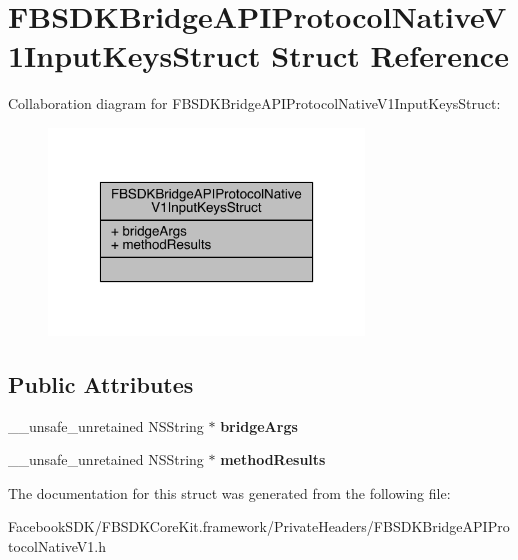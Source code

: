 \hypertarget{struct_f_b_s_d_k_bridge_a_p_i_protocol_native_v1_input_keys_struct}{\section{F\-B\-S\-D\-K\-Bridge\-A\-P\-I\-Protocol\-Native\-V1\-Input\-Keys\-Struct Struct Reference}
\label{struct_f_b_s_d_k_bridge_a_p_i_protocol_native_v1_input_keys_struct}
}


Collaboration diagram for F\-B\-S\-D\-K\-Bridge\-A\-P\-I\-Protocol\-Native\-V1\-Input\-Keys\-Struct\-:
\nopagebreak
\begin{figure}[H]
\begin{center}
\leavevmode
\includegraphics[width=238pt]{struct_f_b_s_d_k_bridge_a_p_i_protocol_native_v1_input_keys_struct__coll__graph}
\end{center}
\end{figure}
\subsection*{Public Attributes}
\begin{DoxyCompactItemize}
\item 
\hypertarget{struct_f_b_s_d_k_bridge_a_p_i_protocol_native_v1_input_keys_struct_a58b7ae6ad1916a567e277f4ab7490215}{\-\_\-\-\_\-unsafe\-\_\-unretained N\-S\-String $\ast$ {\bfseries bridge\-Args}}\label{struct_f_b_s_d_k_bridge_a_p_i_protocol_native_v1_input_keys_struct_a58b7ae6ad1916a567e277f4ab7490215}

\item 
\hypertarget{struct_f_b_s_d_k_bridge_a_p_i_protocol_native_v1_input_keys_struct_a97915801fd748cf903eefbb8c3df34ac}{\-\_\-\-\_\-unsafe\-\_\-unretained N\-S\-String $\ast$ {\bfseries method\-Results}}\label{struct_f_b_s_d_k_bridge_a_p_i_protocol_native_v1_input_keys_struct_a97915801fd748cf903eefbb8c3df34ac}

\end{DoxyCompactItemize}


The documentation for this struct was generated from the following file\-:\begin{DoxyCompactItemize}
\item 
Facebook\-S\-D\-K/\-F\-B\-S\-D\-K\-Core\-Kit.\-framework/\-Private\-Headers/F\-B\-S\-D\-K\-Bridge\-A\-P\-I\-Protocol\-Native\-V1.\-h\end{DoxyCompactItemize}
